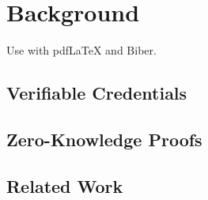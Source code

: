 
\chapter{Background}\label{chapter:background}
Use with pdfLaTeX and Biber.

\section{Verifiable Credentials}

\section{Zero-Knowledge Proofs}

\section{Related Work}